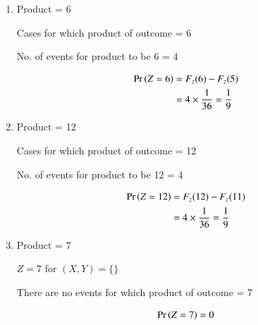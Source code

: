 \documentclass[journal,12pt,twocolumn]{IEEEtran}
\begin{document}
\begin{enumerate}
\item Product = 6

\begin{table}[h]
	
	\caption{Cases for which product of outcome = 6}
	\label{tab:Table1}
\end{table}

No. of events for product to be 6 = 4 

\begin{align}
\Pr\left(Z=6\right)&= F_z(6)-F_z(5)\\
&= 4 \times \frac{1}{36}=\frac{1}{9} 
\end{align}

\item Product = 12

\begin{table}[h]
	
	\caption{Cases for which product of outcome = 12}
	\label{tab:Table2}
\end{table}

No. of events for product to be 12 = 4 

\begin{align}
\Pr\left(Z=12\right)&= F_z(12)-F_z(11)\\
&= 4 \times \frac{1}{36}=\frac{1}{9} 
\end{align}
\item Product = 7

$Z=7$ for $(X,Y) = \{\}$

There are no events for which product of outcome = 7

\begin{align}
\Pr\left(Z=7\right) = 0
\end{align}

\end{enumerate}
\end{document}
